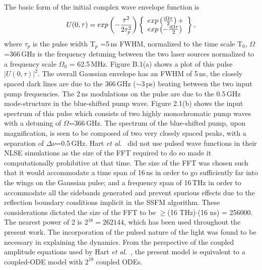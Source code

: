 The basic form of the initial complex wave envelope function is 
\begin {equation}
U(0,\tau) = exp \left( - {\tau^2 \over 2\tau_p^2} \right)
\left\{ 
\begin{array}{l}
exp\left( {i\Omega\tau \over 2} \right) + \\
exp\left( - {i\Omega\tau \over 2} \right)
\end{array}
\right\} ,
\end{equation}
where $\tau_p$ is the pulse width T$_p$ =5\,ns FWHM, normalized to the time scale 
T$_0$, $\Omega$=366\,GHz is the frequency detuning between the two laser 
sources normalized to a frequency scale $\Omega_0$ = 62.5\,MHz.  Figure B.1(a) 
shows a plot of this pulse $|U(0,\tau)|^2$. The overall Gaussian envelope 
has an FWHM of 5\,ns, the closely spaced dark lines are due to the 366\,GHz 
($\sim$3\,ps) beating between the two input pump frequencies. The 2\,ns 
modulations on the pulse are due to the 0.5\,GHz mode-structure in the 
blue-shifted pump wave. Figure 2.1(b) shows the input spectrum of this pulse 
which consists of two highly monochromatic pump waves with a detuning of 
$\Omega$=366\,GHz. The spectrum of the blue-shifted pump, upon magnification, 
is seen to be composed of two very closely spaced peaks, with a separation of 
$\Delta\nu$=0.5\,GHz. Hart {\it et al}.\ \cite{hart1} did not use pulsed 
wave functions in their NLSE simulations as the size of the FFT required to do 
so made it computationally prohibitive at that time. The size of the FFT was 
chosen such that it would accommodate a time span of 16\,ns in order to go 
sufficiently far into the wings on the Gaussian pulse; and a frequency span of 
16\,THz in order to accommodate all the sidebands generated and prevent 
spurious effects due to the reflection boundary conditions implicit in the 
SSFM algorithm. These considerations dictated the size of the FFT to be 
$\geq$(16 THz)$\cdot$(16 ns) = 256000. The nearest power of 2 is 
2$^{18} = 262144$, which has been used throughout the present work. The 
incorporation of the pulsed nature of the light was found to be necessary in 
explaining the dynamics. From the perspective of the coupled amplitude 
equations used by Hart {\it et al}.\ \cite{hart1}, the present model is equivalent 
to a coupled-ODE model with $2^{18}$ coupled ODEs. 


